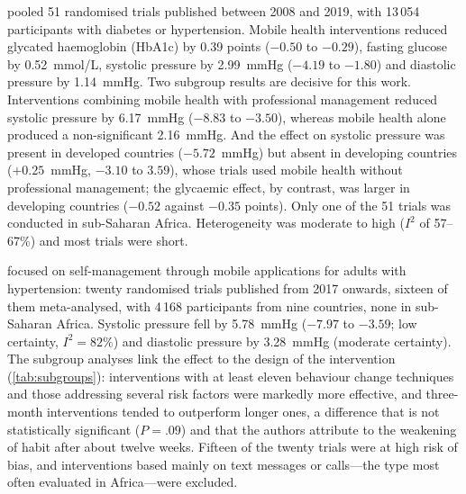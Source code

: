 \Textcite{mao2020} pooled 51 randomised trials published between 2008 and 2019, with 13\,054 participants with diabetes or hypertension. Mobile health interventions reduced glycated haemoglobin (HbA1c) by 0.39 points ($-0.50$ to $-0.29$), fasting glucose by 0.52~mmol/L, systolic pressure by 2.99~mmHg ($-4.19$ to $-1.80$) and diastolic pressure by 1.14~mmHg. Two subgroup results are decisive for this work. Interventions combining mobile health with professional management reduced systolic pressure by 6.17~mmHg ($-8.83$ to $-3.50$), whereas mobile health alone produced a non-significant 2.16~mmHg. And the effect on systolic pressure was present in developed countries ($-5.72$~mmHg) but absent in developing countries ($+0.25$~mmHg, $-3.10$ to $3.59$), whose trials used mobile health without professional management; the glycaemic effect, by contrast, was larger in developing countries ($-0.52$ against $-0.35$ points). Only one of the 51 trials was conducted in sub-Saharan Africa. Heterogeneity was moderate to high ($I^2$ of 57--67\%) and most trials were short.

\Textcite{zhou2024} focused on self-management through mobile applications for adults with hypertension: twenty randomised trials published from 2017 onwards, sixteen of them meta-analysed, with 4\,168 participants from nine countries, none in sub-Saharan Africa. Systolic pressure fell by 5.78~mmHg ($-7.97$ to $-3.59$; low certainty, $I^2 = 82\%$) and diastolic pressure by 3.28~mmHg (moderate certainty). The subgroup analyses link the effect to the design of the intervention (\cref{tab:subgroups}): interventions with at least eleven behaviour change techniques and those addressing several risk factors were markedly more effective, and three-month interventions tended to outperform longer ones, a difference that is not statistically significant ($P = .09$) and that the authors attribute to the weakening of habit after about twelve weeks. Fifteen of the twenty trials were at high risk of bias, and interventions based mainly on text messages or calls---the type most often evaluated in Africa---were excluded.

